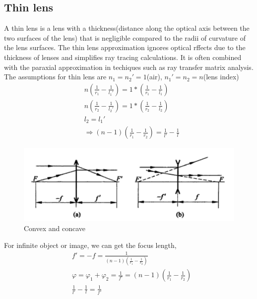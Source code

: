 \documentclass[../main.tex]{subfiles}
\begin{document}
	\subsection{Thin lens}
	A thin lens is a lens with a thickness(distance along the optical axis between the two surfaces of the lens) that is negligible compared to the radii of curvature of the lens surfaces.
	The thin lens approximation ignores optical rffects due to the thickness of lenses and simplifies ray tracing calculations. It is often combined with the paraxial approximation in techiques such as ray transfer matrix analysis.
	The assumptions for thin lens are $n_1=n_2'=1$(air), $n_1'=n_2=n$(lens index)
	\begin{align}
		&n\left(\frac{1}{r_1}-\frac{1}{l_1'}\right)=1*\left(\frac{1}{r_1}-\frac{1}{l_1}\right)\\
		&n\left(\frac{1}{r_2}-\frac{1}{l_2'}\right)=1*\left(\frac{1}{r_2}-\frac{1}{l_2}\right)\\
		&l_2=l_1'\\
		&\Rightarrow(n-1)\left(\frac{1}{r_1}-\frac{1}{r_2}\right)=\frac{1}{l'}-\frac{1}{l}
	\end{align}
	\begin{figure}[h!]
		\centering
		\includegraphics[scale=0.8]{../graphics/Geometrical_optics11.png}
		\caption{Convex and concave}
		\label{fig:lens}
	\end{figure}
	For infinite object or image, we can get the focus length,
	\begin{align}
		&f'=-f=\frac{1}{(n-1)\left(\frac{1}{r_1}-\frac{1}{r_2}\right)}\\
		&\varphi=\varphi_1+\varphi_2=\frac{1}{f'}=(n-1)\left(\frac{1}{r_1}-\frac{1}{r_2}\right)\\
		&\frac{1}{l'}-\frac{1}{l}=\frac{1}{f'}
	\end{align}
\end{document}
